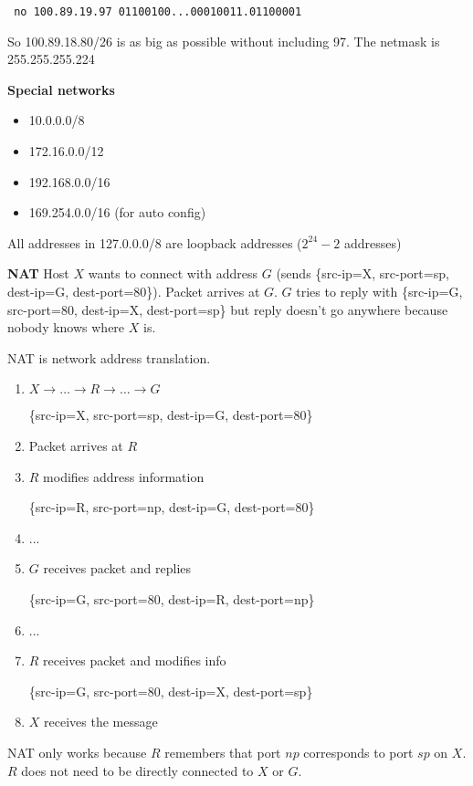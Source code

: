 \documentclass[10pt, a4paper]{article}
\begin{document}
\begin{multicols}{4}
    \texttt{ no 100.89.19.97 01100100...00010011.01\color{blue}1\color{black}00001}

    \tiny
    So 100.89.18.80/26 is as big as possible without including 97. The netmask is 255.255.255.224

    \textbf{Special networks}
    \begin{itemize}
        \item 10.0.0.0/8
        \item 172.16.0.0/12
        \item 192.168.0.0/16
        \item 169.254.0.0/16 (for auto config)
    \end{itemize}
    All addresses in 127.0.0.0/8 are loopback addresses ($2^{24} - 2$ addresses)

    \textbf{NAT} Host $X$ wants to connect with address $G$ (sends \{src-ip=X, src-port=sp, dest-ip=G, dest-port=80\}). Packet arrives at $G$. $G$ tries to reply with \{src-ip=G, src-port=80, dest-ip=X, dest-port=sp\} but reply doesn't go anywhere because nobody knows where $X$ is.

    NAT is network address translation.
    \begin{enumerate}
        \item $X \to \ldots \to R \to \ldots \to G$
        
        \{src-ip=X, src-port=sp, dest-ip=G, dest-port=80\}
        \item Packet arrives at $R$
        \item $R$ modifies address information
        
        \{src-ip=R, src-port=np, dest-ip=G, dest-port=80\}
        \item ...
        \item $G$ receives packet and replies
        
        \{src-ip=G, src-port=80, dest-ip=R, dest-port=np\}
        \item ... 
        \item $R$ receives packet and modifies info
        
        \{src-ip=G, src-port=80, dest-ip=X, dest-port=sp\}
        \item $X$ receives the message
    \end{enumerate}

    NAT only works because $R$ remembers that port $np$ corresponds to port $sp$ on $X$. $R$ does not need to be directly connected to $X$ or $G$.


\end{multicols}
\end{document}
